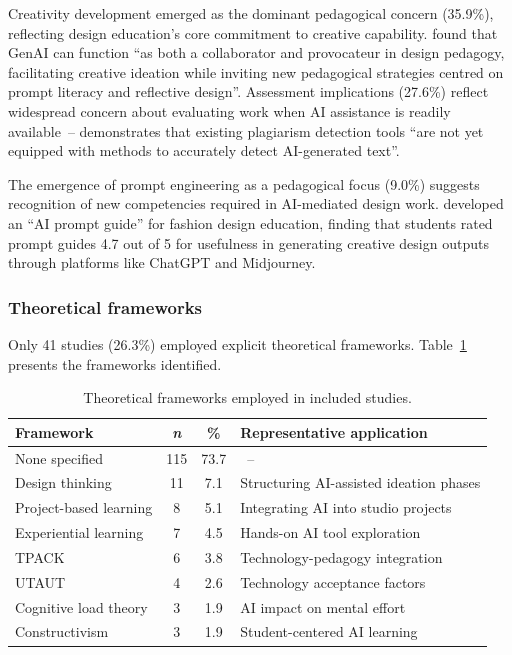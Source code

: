\documentclass[ed]{acnsart}
\begin{document}
Creativity development emerged as the dominant pedagogical concern (35.9\%), reflecting design education's core commitment to creative capability. \citet{MedelVera2025} found that GenAI can function ``as both a collaborator and provocateur in design pedagogy, facilitating creative ideation while inviting new pedagogical strategies centred on prompt literacy and reflective design''. Assessment implications (27.6\%) reflect widespread concern about evaluating work when AI assistance is readily available~-- \citet{Perkins2023} demonstrates that existing plagiarism detection tools ``are not yet equipped with methods to accurately detect AI-generated text''.

The emergence of prompt engineering as a pedagogical focus (9.0\%) suggests recognition of new competencies required in AI-mediated design work. \citet{Lee2024} developed an ``AI prompt guide'' for fashion design education, finding that students rated prompt guides 4.7 out of 5 for usefulness in generating creative design outputs through platforms like ChatGPT and Midjourney.

\subsubsection{Theoretical frameworks}

Only 41 studies (26.3\%) employed explicit theoretical frameworks. Table~\ref{tab:theory} presents the frameworks identified.

\begin{table}[htbp]
\centering
\caption{Theoretical frameworks employed in included studies.}
\label{tab:theory}
\small
\begin{tabular}{@{}lccl@{}}
\toprule
\hfill \textbf{Framework} & \textbf{\textit{n}} & \textbf{\%} & \hfill \textbf{Representative application} \\
\midrule
None specified & 115 & 73.7 & ~--  \\
Design thinking & 11 & 7.1 & Structuring AI-assisted ideation phases \\
Project-based learning & 8 & 5.1 & Integrating AI into studio projects \\
Experiential learning & 7 & 4.5 & Hands-on AI tool exploration \\
TPACK & 6 & 3.8 & Technology-pedagogy integration \\
UTAUT & 4 & 2.6 & Technology acceptance factors \\
Cognitive load theory & 3 & 1.9 & AI impact on mental effort \\
Constructivism & 3 & 1.9 & Student-centered AI learning \\
\bottomrule
\end{tabular}
\end{table}
\end{document}
